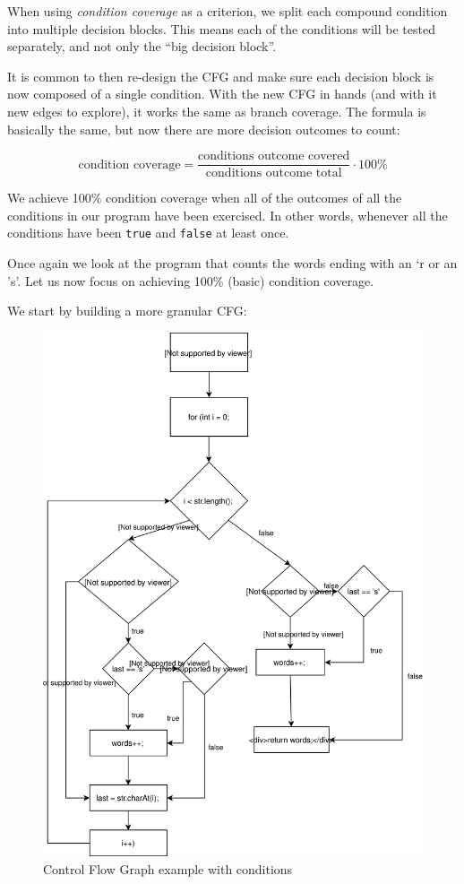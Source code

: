 When using \emph{condition coverage} as a criterion, we split each
compound condition into multiple decision blocks. This means each of the
conditions will be tested separately, and not only the ``big decision
block''.

It is common to then re-design the CFG and make sure each decision block
is now composed of a single condition. With the new CFG in hands (and
with it new edges to explore), it works the same as branch coverage. The
formula is basically the same, but now there are more decision outcomes
to count:

\[\text{condition coverage} = \frac{\text{conditions outcome covered}}{\text{conditions outcome total}} \cdot 100\%\]

We achieve 100\% condition coverage when all of the outcomes of all the
conditions in our program have been exercised. In other words, whenever
all the conditions have been \texttt{true} and \texttt{false} at least
once.

Once again we look at the program that counts the words ending with an
`r or an 's'. Let us now focus on achieving 100\% (basic) condition
coverage.

We start by building a more granular CFG:

\begin{figure}
\centering
\includegraphics{img/structural-testing/examples/CFG-condition-example.svg}
\caption{Control Flow Graph example with conditions}
\end{figure}


